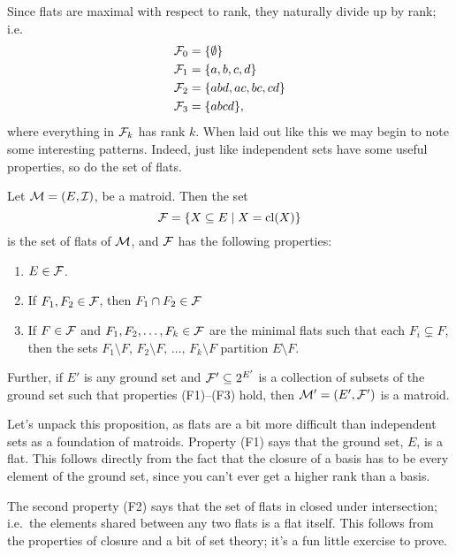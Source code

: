 \documentclass[12pt,oneside]{../../sfsuthesis}
\begin{document}
Since flats are maximal with respect to rank, they naturally divide up by rank; i.e.
\begin{align*}
    \mathcal{F}_0 & = \{ \emptyset \}       \\
    \mathcal{F}_1 & = \{ a, b, c, d \}      \\
    \mathcal{F}_2 & = \{ abd, ac, bc, cd \} \\
    \mathcal{F}_3 & = \{ abcd\},            \\
\end{align*}
where everything in \( \mathcal{F}_k \) has rank \( k \).
When laid out like this we may begin to note some interesting patterns.
Indeed, just like independent sets have some useful properties, so do the set of flats.

\begin{proposition}\th\label{prop:matroidFlatAxioms}
    Let \( \mathcal{M} = (E, \mathcal{I}) \), be a matroid.
    Then the set
    \[
        \mathcal{F} = \{ X \subseteq E \; | \; X = \operatorname{cl}(X) \}
    \]
    is the set of flats of \( \mathcal{M} \), and \( \mathcal{F} \) has the following properties:
    \begin{enumerate}[label=(F\arabic*)]
        \item \( E \in \mathcal{F} \).\label{def:F1}
        \item If \(F_1, F_2 \in \mathcal{F}\), then \( F_1 \cap F_2 \in \mathcal{F} \)\label{def:F2}
        \item If \( F \in \mathcal{F} \) and \(F_1, F_2, \dots , F_k \in \mathcal{F} \) are the minimal flats such that each \( F_i \subsetneq F \),
              then the sets \( F_1 \setminus F,\, F_2 \setminus F,\, \dots,\, F_k \setminus F \) partition \( E \setminus F \).\label{def:F3}
    \end{enumerate}

    Further, if \( E' \) is any ground set and \( \mathcal{F}' \subseteq 2^{E'} \) is a collection of subsets of the ground set such that properties (F1)--(F3) hold,
    then \( \mathcal{M}' = (E', \mathcal{F}') \) is a matroid.
\end{proposition}

Let's unpack this proposition, as flats are a bit more difficult than independent sets as a foundation of matroids.
Property (F1) says that the ground set, \( E \), is a flat.
This follows directly from the fact that the closure of a basis has to be every element of the ground set, since you can't ever get a higher rank than a basis.

The second property (F2) says that the set of flats in closed under intersection;
i.e.\ the elements shared between any two flats is a flat itself.
This follows from the properties of closure and a bit of set theory; it's a fun little exercise to prove.
\end{document}
